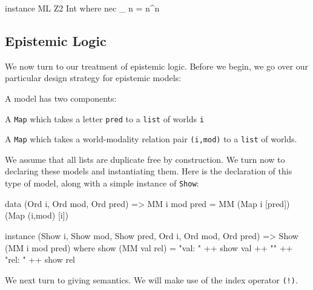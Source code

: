 \documentclass[11pt]{article}
\theoremstyle{definition}
\begin{document}
\begin{code}
instance ML Z2 Int where
  nec _ n = n^n
\end{code}

\subsection{Epistemic Logic}
We now turn to our treatment of epistemic logic.  Before we begin, we go over our particular design strategy for epistemic models: 

\begin{bul}
\item A model has two components:
\begin{mynum}
	\item A \texttt{Map} which takes a letter \texttt{pred} to a \texttt{list} of worlds \texttt{i}
	\item A \texttt{Map} which takes a world-modality relation pair \texttt{(i,mod)} to a \texttt{list} of worlds.
\end{mynum}
\end{bul}

We assume that all lists are duplicate free by construction.  We turn now to declaring these models and instantiating them.  Here is the declaration of this type of model, along with a simple instance of \texttt{Show}:
\begin{code}
data (Ord i, Ord mod, Ord pred) => MM i mod pred =
     MM (Map i [pred]) (Map (i,mod) [i])

instance (Show i, Show mod, Show pred, Ord i, Ord mod, Ord pred) => 
  Show (MM i mod pred) where
    show (MM val rel) = "val: " ++ show val ++ "\n" ++ "rel: " ++ show rel
\end{code}

We next turn to giving semantics.  We will make use of the index operator \texttt{(!)}.
%
%  
\end{document}
